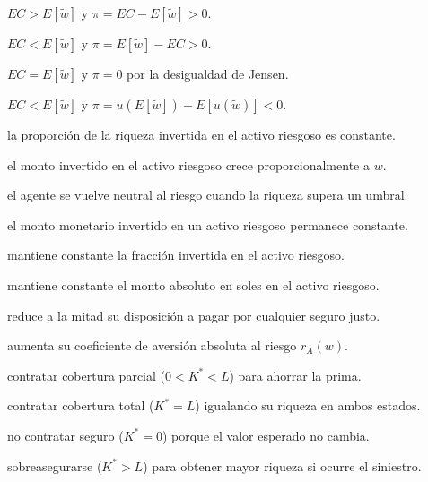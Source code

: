 \begin{opts}
    \item $EC > E[\tilde{w}]$ y $\pi = EC - E[\tilde{w}] > 0$.
    \item $EC < E[\tilde{w}]$ y $\pi = E[\tilde{w}] - EC > 0$.
    \item $EC = E[\tilde{w}]$ y $\pi = 0$ por la desigualdad de Jensen.
    \item $EC < E[\tilde{w}]$ y $\pi = u(E[\tilde{w}]) - E[u(\tilde{w})] < 0$.
\end{opts}

\begin{opts}
    \item la proporción de la riqueza invertida en el activo riesgoso es constante.
    \item el monto invertido en el activo riesgoso crece proporcionalmente a $w$.
    \item el agente se vuelve neutral al riesgo cuando la riqueza supera un umbral.
    \item el monto monetario invertido en un activo riesgoso permanece constante.
\end{opts}

\begin{opts}
    \item mantiene constante la fracción invertida en el activo riesgoso.
    \item mantiene constante el monto absoluto en soles en el activo riesgoso.
    \item reduce a la mitad su disposición a pagar por cualquier seguro justo.
    \item aumenta su coeficiente de aversión absoluta al riesgo $r_A(w)$.
\end{opts}

\begin{opts}
    \item contratar cobertura parcial ($0 < K^* < L$) para ahorrar la prima.
    \item contratar cobertura total ($K^* = L$) igualando su riqueza en ambos estados.
    \item no contratar seguro ($K^* = 0$) porque el valor esperado no cambia.
    \item sobreasegurarse ($K^* > L$) para obtener mayor riqueza si ocurre el siniestro.
\end{opts}

